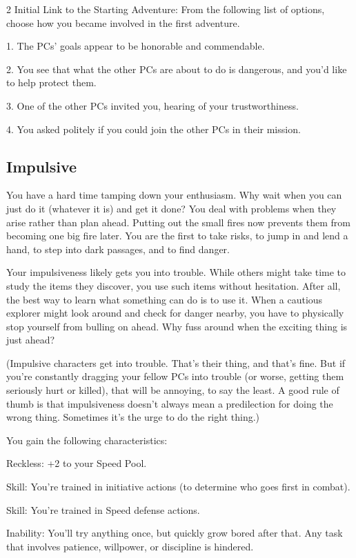 \begin{multicols}{2}
Initial Link to the Starting Adventure: From the following list of options, choose how you became involved in the first adventure.

1. The PCs’ goals appear to be honorable and commendable.

2. You see that what the other PCs are about to do is dangerous, and you’d like to help protect them.

3. One of the other PCs invited you, hearing of your trustworthiness.

4. You asked politely if you could join the other PCs in their mission.

\subsection{Impulsive}

You have a hard time tamping down your enthusiasm. Why wait when you can just do it (whatever it is) and get it done? You deal with problems when they arise rather than plan ahead. Putting out the small fires now prevents them from becoming one big fire later. You are the first to take risks, to jump in and lend a hand, to step into dark passages, and to find danger.

Your impulsiveness likely gets you into trouble. While others might take time to study the items they discover, you use such items without hesitation. After all, the best way to learn what something can do is to use it. When a cautious explorer might look around and check for danger nearby, you have to physically stop yourself from bulling on ahead. Why fuss around when the exciting thing is just ahead?

(Impulsive characters get into trouble. That’s their thing, and that’s fine. But if you’re constantly dragging your fellow PCs into trouble (or worse, getting them seriously hurt or killed), that will be annoying, to say the least. A good rule of thumb is that impulsiveness doesn’t always mean a predilection for doing the wrong thing. Sometimes it’s the urge to do the right thing.)

You gain the following characteristics:

Reckless: +2 to your Speed Pool.

Skill: You’re trained in initiative actions (to determine who goes first in combat). 

Skill: You’re trained in Speed defense actions.

Inability: You’ll try anything once, but quickly grow bored after that. Any task that involves patience, willpower, or discipline is hindered.


\end{multicols}
